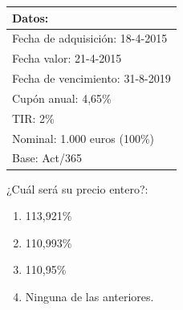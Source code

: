 \documentclass[
  letterpaper,
  DIV=11,
  numbers=noendperiod]{scrreprt}
\begin{document}
\begin{longtable}[]{@{}l@{}}
\toprule()
\textbf{Datos:} \\
\midrule()
\endhead
Fecha de adquisición: 18-4-2015 \\
Fecha valor: 21-4-2015 \\
Fecha de vencimiento: 31-8-2019 \\
Cupón anual: 4,65\% \\
TIR: 2\% \\
Nominal: 1.000 euros (100\%) \\
Base: Act/365 \\
\bottomrule()
\end{longtable}

¿Cuál será su precio entero?:

\begin{enumerate}
\def\labelenumi{\alph{enumi}.}
\item
  113,921\%
\item
  110,993\%
\item
  110,95\%
\item
  Ninguna de las anteriores.
\end{enumerate}
\end{document}
